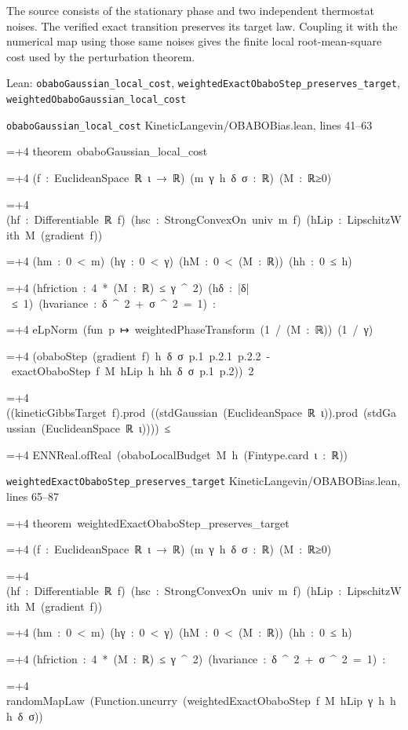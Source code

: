 \documentclass[11pt,a4paper]{article}
\newlength{\leancharwidth}
\newenvironment{leancode}{\par\smallskip\begingroup\ttfamily\footnotesize\raggedright
  \settowidth{\leancharwidth}{M}\setlength{\parskip}{0pt}\setlength{\parindent}{0pt}
  \frenchspacing}{\par\endgroup\smallskip}
\newcommand{\leanline}[2]{\hangindent=\dimexpr#1\leancharwidth+4\leancharwidth\relax
  \hangafter=1\noindent\hspace*{#1\leancharwidth}#2\par}
\newcommand{\leansource}[1]{\par{\footnotesize\color{leanmuted}#1}\par}
\begin{document}
The source consists of the stationary phase and two independent thermostat noises. The verified exact transition preserves its target law. Coupling it with the numerical map using those same noises gives the finite local root-mean-square cost used by the perturbation theorem.

\begin{leanbox}{Lean: \texttt{obaboGaussian\_\allowbreak{}local\_\allowbreak{}cost}, \texttt{weightedExactObaboStep\_\allowbreak{}preserves\_\allowbreak{}target}, \texttt{weightedObaboGaussian\_\allowbreak{}local\_\allowbreak{}cost}}
\leansource{\texttt{obaboGaussian\_\allowbreak{}local\_\allowbreak{}cost} \quad KineticLangevin/\allowbreak{}OBABOBias.lean, lines 41–63}
\begin{leancode}
\leanline{0}{theorem\ obaboGaussian\_local\_cost}
\leanline{4}{(f\ :\ EuclideanSpace\ ℝ\ ι\ →\ ℝ)\ (m\ γ\ h\ δ\ σ\ :\ ℝ)\ (M\ :\ ℝ≥0)}
\leanline{4}{(hf\ :\ Differentiable\ ℝ\ f)\ (hsc\ :\ StrongConvexOn\ univ\ m\ f)\ (hLip\ :\ LipschitzWith\ M\ (gradient\ f))}
\leanline{4}{(hm\ :\ 0\ <\ m)\ (hγ\ :\ 0\ <\ γ)\ (hM\ :\ 0\ <\ (M\ :\ ℝ))\ (hh\ :\ 0\ ≤\ h)}
\leanline{4}{(hfriction\ :\ 4\ *\ (M\ :\ ℝ)\ ≤\ γ\ \textasciicircum{}\ 2)\ (hδ\ :\ |δ|\ ≤\ 1)\ (hvariance\ :\ δ\ \textasciicircum{}\ 2\ +\ σ\ \textasciicircum{}\ 2\ =\ 1)\ :}
\leanline{4}{eLpNorm\ (fun\ p\ ↦\ weightedPhaseTransform\ (1\ /\ (M\ :\ ℝ))\ (1\ /\ γ)}
\leanline{6}{(obaboStep\ (gradient\ f)\ h\ δ\ σ\ p.1\ p.2.1\ p.2.2\ -\ exactObaboStep\ f\ M\ hLip\ h\ hh\ δ\ σ\ p.1\ p.2))\ 2}
\leanline{6}{((kineticGibbsTarget\ f).prod\ ((stdGaussian\ (EuclideanSpace\ ℝ\ ι)).prod\ (stdGaussian\ (EuclideanSpace\ ℝ\ ι))))\ ≤}
\leanline{8}{ENNReal.ofReal\ (obaboLocalBudget\ M\ h\ (Fintype.card\ ι\ :\ ℝ))}
\end{leancode}
\leansource{\texttt{weightedExactObaboStep\_\allowbreak{}preserves\_\allowbreak{}target} \quad KineticLangevin/\allowbreak{}OBABOBias.lean, lines 65–87}
\begin{leancode}
\leanline{0}{theorem\ weightedExactObaboStep\_preserves\_target}
\leanline{4}{(f\ :\ EuclideanSpace\ ℝ\ ι\ →\ ℝ)\ (m\ γ\ h\ δ\ σ\ :\ ℝ)\ (M\ :\ ℝ≥0)}
\leanline{4}{(hf\ :\ Differentiable\ ℝ\ f)\ (hsc\ :\ StrongConvexOn\ univ\ m\ f)\ (hLip\ :\ LipschitzWith\ M\ (gradient\ f))}
\leanline{4}{(hm\ :\ 0\ <\ m)\ (hγ\ :\ 0\ <\ γ)\ (hM\ :\ 0\ <\ (M\ :\ ℝ))\ (hh\ :\ 0\ ≤\ h)}
\leanline{4}{(hfriction\ :\ 4\ *\ (M\ :\ ℝ)\ ≤\ γ\ \textasciicircum{}\ 2)\ (hvariance\ :\ δ\ \textasciicircum{}\ 2\ +\ σ\ \textasciicircum{}\ 2\ =\ 1)\ :}
\leanline{4}{randomMapLaw\ (Function.uncurry\ (weightedExactObaboStep\ f\ M\ hLip\ γ\ h\ hh\ δ\ σ))}

\end{leancode}
\end{leanbox}
\end{document}

